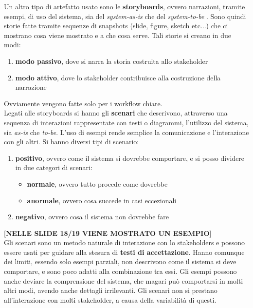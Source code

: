Un altro tipo di artefatto usato sono le \textbf{storyboards}, ovvero narrazioni, tramite esempi, di uso del sistema, sia del \textit{system-as-is} che del \textit{system-to-be} . Sono quindi storie fatte tramite sequenze di snapshots (slide, figure, sketch etc$\ldots$) che ci mostrano cosa viene mostrato e a che cosa serve. Tali storie si creano in due modi:
\begin{enumerate}
  \item \textbf{modo passivo}, dove si narra la storia costruita allo stakeholder
  \item \textbf{modo attivo}, dove lo stakeholder contribuisce alla costruzione della narrazione
 \end{enumerate}
Ovviamente vengono fatte solo per i workflow chiare.\\
Legati alle storyboards si hanno gli \textbf{scenari} che descrivono, attraverso una sequenza di interazioni rappresentate con testi o diagrammi, l'utilizzo del sistema, sia \textit{as-is} che \textit{to-be}. L'uso di esempi rende semplice la comunicazione e l'interazione con gli altri. Si hanno diversi tipi di scenario:
\begin{enumerate}
    \item \textbf{positivo}, ovvero come il sistema si dovrebbe comportare, e si posso dividere in due categori di scenari:
    \begin{itemize}
        \item \textbf{normale}, ovvero tutto procede come dovrebbe
        \item \textbf{anormale}, ovvero cosa succede in casi eccezionali
    \end{itemize}
    \item \textbf{negativo}, ovvero cosa il sistema non dovrebbe fare
\end{enumerate}
[\textbf{NELLE SLIDE 18/19 VIENE MOSTRATO UN ESEMPIO}]\\
Gli scenari sono un metodo naturale di interazione con lo stakeholders e possono essere usati per guidare alla stesura di \textbf{testi di accettazione}. Hanno comunque dei limiti, essendo solo esempi parziali, non descrivono come il sistema si deve comportare, e sono poco adatti alla combinazione tra essi. Gli esempi possono anche deviare la comprensione del sistema, che magari può comportarsi in molti altri modi, avendo anche dettagli irrilevanti. Gli scenari non si prestano all'interazione con molti stakeholder, a causa della variabilità di questi.\\

